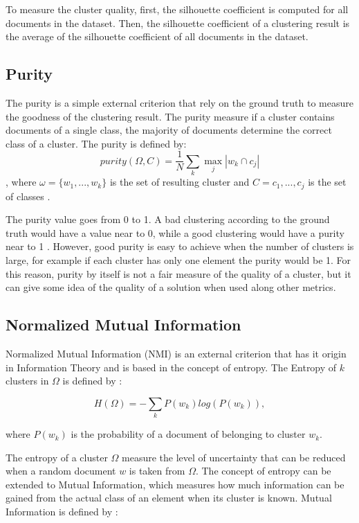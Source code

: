 To measure the cluster quality, first, the silhouette coefficient is computed for all documents in the dataset. Then, the silhouette coefficient of a clustering result is the average of the silhouette coefficient of all documents in the dataset. 
\subsection{Purity}
The purity is a simple external criterion that rely on the ground truth to measure the goodness of the clustering result. The purity measure if a cluster contains documents of a single class, the majority of documents determine the correct class of a cluster. The purity is defined by:
$$purity(\Omega, C) = \frac{1}{N}\sum_k\max_j |w_k \cap c_j|$$,
where $\omega = \{w_1, ..., w_k\}$  is the set of resulting cluster and  $C = {c_1,..., c_j}$ is the set of classes \cite{manning2008introduction}. 

The purity value goes from 0 to 1. A bad clustering according to the ground truth would have a value near to 0, while a good clustering would have a purity near to 1 \cite{manning2008introduction}. However, good purity is easy to achieve when the number of clusters is large, for example if each cluster has only one element the purity would be 1. For this reason, purity by itself is not a fair measure of the quality of a cluster, but it can give some idea of the quality of a solution when used along other metrics.

\subsection{Normalized Mutual Information}
Normalized Mutual Information (NMI) is an external criterion that has it origin in Information Theory and is based in the concept of entropy. The Entropy of $k$ clusters in $\Omega$ is defined by \cite{manning2008introduction}:

$$H(\Omega) = -\sum_k P(w_k)log(P(w_k)),$$

where $P(w_k)$ is the probability of a document of belonging to cluster $w_k$.

The entropy of a cluster $\Omega$ measure the level of uncertainty that can be reduced when a random document $w$ is taken from $\Omega$. 
The concept of entropy can be extended to Mutual Information, which measures how much information can be gained from the actual class of an element when its cluster is known. Mutual Information is defined by \cite{manning2008introduction}:

